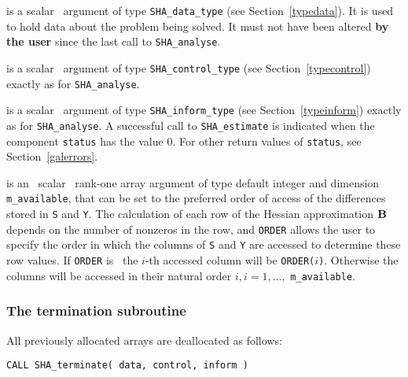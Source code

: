 \documentclass{galahad}
\newcommand{\packagename}{SHA}
\begin{document}
\begin{description}
 is a scalar \intentinout\ argument of type 
{\tt \packagename\_data\_type}
(see Section~\ref{typedata}). It is used to hold data about the problem being 
solved. It must not have been altered {\bf by the user} since the last call to 
{\tt \packagename\_analyse}.

 is a scalar \intentin\ argument of type 
{\tt \packagename\_control\_type}
(see Section~\ref{typecontrol})
exactly as for
{\tt \packagename\_analyse}. 

 is a scalar \intentinout\ argument of type 
{\tt \packagename\_inform\_type}
(see Section~\ref{typeinform})
exactly as for
{\tt \packagename\_analyse}. 
A successful call to
{\tt \packagename\_estimate}
is indicated when the  component {\tt status} has the value 0. 
For other return values of {\tt status}, see Section~\ref{galerrors}.

 is an \optional\ scalar \intentin\ rank-one array argument 
of type default integer and dimension {\tt m\_available}, that can be set
to the preferred order of access of the differences stored 
in {\tt S} and {\tt Y}. The calculation of each row of the 
Hessian approximation ${\mathbf{B}}$ depends on the number of nonzeros in the row,
and {\tt ORDER} allows the user to specify the order in which the columns
of  {\tt S} and {\tt Y} are accessed to determine these row values. 
If {\tt ORDER} is \present\, the $i$-th accessed column will be
{\tt ORDER(}$i${\tt )}. Otherwise the columns will be accessed
in their natural order $i, i = 1, \ldots ,$ {\tt m\_available}.

\end{description}


\subsubsection{The  termination subroutine}
All previously allocated arrays are deallocated as follows:
\vspace*{1mm}

\hspace{8mm}
{\tt CALL \packagename\_terminate( data, control, inform )}
\end{document}
